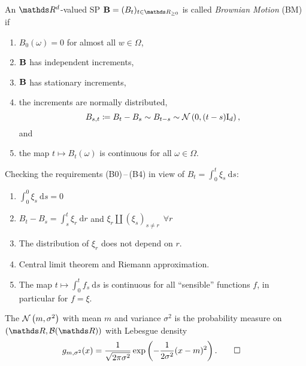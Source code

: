 \begin{defi}
An $\Rd$-valued SP $\B=(B_t)_{t \in \R_{\geq 0}}$
is called \emph{Brownian Motion} (BM) if
\begin{enumerate}[label=(B\arabic*)]
\item $B_0(\omega)=0$ for almost all $w\in \Omega$,
\item $\mathbf{B}$ has independent increments,
\item $\mathbf{B}$ has stationary increments,
\item the increments are normally distributed, \ie
	\[B_{s,t} \coloneqq B_t - B_s \sim B_{t-s}\sim \mathcal{N}\left(0,(t-s)\mathrm{I}_d\right),\]
	and
\item the map $t\mapsto B_t(\omega)$ is continuous for all $\omega \in \Omega$.
\qedhere
\end{enumerate}
\end{defi}

\begin{bem}
Checking the requirements (B0)\,--\,(B4)
in view of $B_t=\int_0^t \xi_s~\mathrm{d}s$:
\begin{enumerate}[label=(B\arabic*)]
\item $\int_0^0\xi_s~\mathrm{d}s=0$
\item $B_t-B_s=\int_s^t \xi_r~\mathrm{d}r$
	and $\xi_r \amalg (\xi_s)_{s\not =r}~~\forall r$
\item The distribution of $\xi_r$ does not depend on $r$.
\item Central limit theorem and Riemann approximation.
\item The map $t \mapsto \int_0^t f_s~\mathrm{d}s$ is continuous
	for all “sensible” functions $f$,
	in particular for $f = \xi$.
\qedhere
\end{enumerate}
\end{bem}

\begin{defi}
The  $\mathcal{N}\left(m,\sigma^2\right)$
with mean $m$ and variance $\sigma^2$ is
the probability measure on $(\R,\mathcal{B}(\R))$ with Lebesgue density
\begin{align*}
	g_{m, \sigma^2}(x) &= \frac{1}{\sqrt{2\pi \sigma^2}} \exp\left(-\frac{1}{2\sigma^2}(x-m)^2\right).
	\qedhere
\end{align*}
\end{defi}

